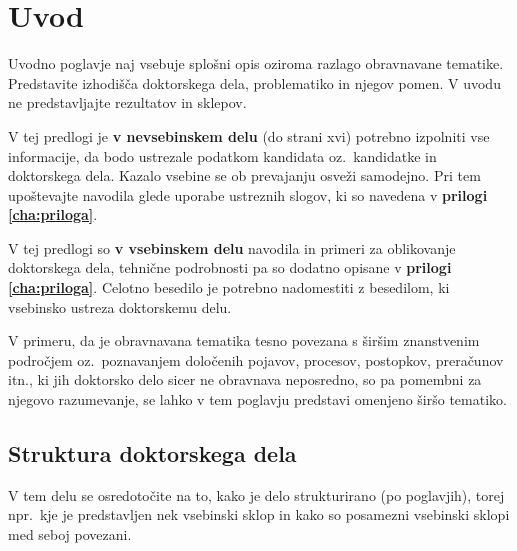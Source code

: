 \chapter{Uvod}\label{cha:uvod}
Uvodno poglavje naj vsebuje splošni opis oziroma razlago obravnavane tematike. Predstavite izhodišča doktorskega dela, problematiko in njegov pomen. V uvodu ne predstavljajte rezultatov in sklepov.

V tej predlogi je \textbf{v nevsebinskem delu} (do strani xvi) potrebno izpolniti vse informacije, da bodo ustrezale podatkom kandidata oz.~kandidatke in doktorskega dela. Kazalo vsebine se ob prevajanju osveži samodejno. Pri tem upoštevajte navodila glede uporabe ustreznih slogov, ki so navedena v \textbf{prilogi \ref{cha:priloga}}.

V tej predlogi so \textbf{v vsebinskem delu} navodila in primeri za oblikovanje doktorskega dela, tehnične podrobnosti pa so dodatno opisane v \textbf{prilogi \ref{cha:priloga}}. Celotno besedilo je potrebno nadomestiti z besedilom, ki vsebinsko ustreza doktorskemu delu.

V primeru, da je obravnavana tematika tesno povezana s širšim znanstvenim področjem oz.~poznavanjem določenih pojavov, procesov, postopkov, preračunov itn., ki jih doktorsko delo sicer ne obravnava neposredno, so pa pomembni za njegovo razumevanje, se lahko v tem poglavju predstavi omenjeno širšo tematiko.

\section{Struktura doktorskega dela}\label{sec:struktura_dela}
V tem delu se osredotočite na to, kako je delo strukturirano (po poglavjih), torej npr.~kje je predstavljen nek vsebinski sklop in kako so posamezni vsebinski sklopi med seboj povezani.

